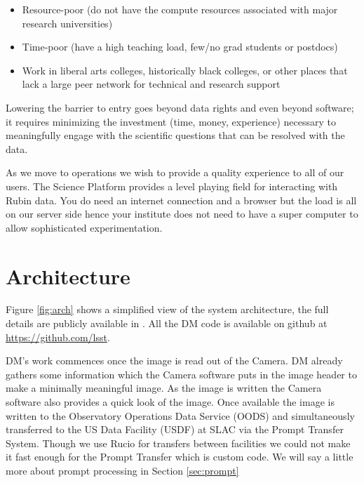 \documentclass[11pt,twoside]{article}
\begin{document}
\begin{itemize}
\item Resource-poor (do not have the compute resources associated with major research universities)
\item Time-poor (have a high teaching load, few/no grad students or postdocs)
\item Work in liberal arts colleges, historically black colleges, or other places that lack a large peer network for technical and research support

\end{itemize}

Lowering the barrier to entry goes beyond data rights and even beyond software; it requires minimizing the investment (time, money, experience) necessary to meaningfully engage with the scientific questions that can be resolved with the data.


As we move to operations we wish to provide a quality experience to all of our users.
The Science Platform provides a level playing field for interacting with Rubin data.
You do need an internet connection and a browser but the load is all on our server side hence your institute does not need to have a super computer to allow sophisticated experimentation.



\section{Architecture}
 Figure \ref{fig:arch} shows a simplified view of the system architecture, the full details are publicly available in \citep{LDM-148}. All the DM code is available on github at \url{https://github.com/lsst}.


\begin{centering}
\end{centering}

DM's work commences once the image is read out of the Camera. DM already gathers some information which the Camera software puts in the image header to make a minimally meaningful image.
As the image is written the Camera software also provides a quick look  of the image.
Once available the image is written to the Observatory Operations Data Service (OODS) and simultaneously transferred to the US Data Facility (USDF) at SLAC via the Prompt Transfer System. Though we use Rucio for transfers between facilities we could not make it fast enough for the Prompt Transfer which is custom code. We will say a little more about prompt processing in Section \ref{sec:prompt}
\end{document}
